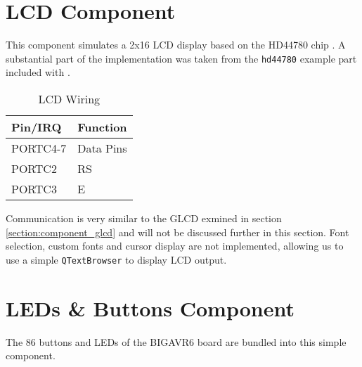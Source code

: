 \section{\acf{LCD} Component} \label{section:component_lcd}

This component simulates a 2x16 \ac{LCD} display based on the HD44780
chip \cite{hitachi01, samsung02, winstar02}. A substantial part of the implementation
was taken from the \verb|hd44780| example part included with \simavr.

\begin{table}[ht]
\centering
\begin{tabular}{l|l}

Pin/\ac{IRQ}        & Function \\

\hline

PORTC4-7            & Data Pins\\
PORTC2              & \acf{RS}\\
PORTC3              & \acf{E}

\end{tabular}
\caption{\ac{LCD} Wiring}
\label{tab:wiring_lcd}
\end{table}

Communication is very similar to the \ac{GLCD} exmined in section
\ref{section:component_glcd} and will not be discussed further in this section.
Font selection, custom fonts and cursor display are not implemented, allowing us to use
a simple \lstinline|QTextBrowser| to display \ac{LCD} output.

\section{\acfp{LED} \& Buttons Component}

The 86 buttons and \acp{LED} of the BIGAVR6 board are bundled into this simple
component.

